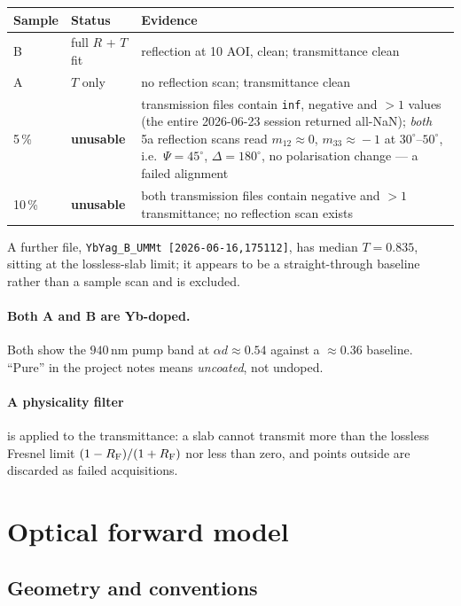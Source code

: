\documentclass[11pt,a4paper]{article}
\newcommand{\ad}{\alpha d}
\begin{document}
\begin{center}\small
\begin{tabular}{@{}llp{7.6cm}@{}}
\toprule
Sample & Status & Evidence \\
\midrule
B & full $R$ + $T$ fit & reflection at 10 AOI, clean; transmittance clean \\
A & $T$ only & no reflection scan; transmittance clean \\
5\,\% & \textbf{unusable} & transmission files contain \texttt{inf}, negative and
$>1$ values (the entire 2026-06-23 session returned all-NaN); \emph{both} 5a
reflection scans read $m_{12}\!\approx\!0$, $m_{33}\!\approx\!-1$ at
$30^\circ$--$50^\circ$, i.e.\ $\Psi=45^\circ$, $\Delta=180^\circ$, no
polarisation change --- a failed alignment \\
10\,\% & \textbf{unusable} & both transmission files contain negative and $>1$
transmittance; no reflection scan exists \\
\bottomrule
\end{tabular}
\end{center}

A further file, \texttt{YbYag\_B\_UMMt [2026-06-16,175112]}, has median
$T=0.835$, sitting at the lossless-slab limit; it appears to be a
straight-through baseline rather than a sample scan and is excluded.

\paragraph{Both A and B are Yb-doped.} Both show the $940$\,nm pump band at
$\ad\approx0.54$ against a $\approx0.36$ baseline. ``Pure'' in the project
notes means \emph{uncoated}, not undoped.

\paragraph{A physicality filter} is applied to the transmittance: a slab cannot
transmit more than the lossless Fresnel limit
$(1-R_{\rm F})/(1+R_{\rm F})$ nor less than zero, and points outside are
discarded as failed acquisitions.

\section{Optical forward model}

\subsection{Geometry and conventions}
\end{document}
